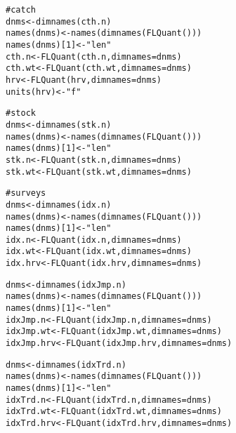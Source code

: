 \documentclass[a4paper,english,10pt]{article}\usepackage[]{graphicx}\usepackage[]{color}
\makeatletter
\newcommand{\hlnum}[1]{\textcolor[rgb]{0.2,0.2,0.2}{#1}}%
\newcommand{\hlstr}[1]{\textcolor[rgb]{0.2,0.2,0.2}{#1}}%
\newcommand{\hlcom}[1]{\textcolor[rgb]{0.2,0.267,0.4}{#1}}%
\newcommand{\hlstd}[1]{\textcolor[rgb]{0,0,0}{#1}}%
\newcommand{\hlkwb}[1]{\textcolor[rgb]{0.361,0.506,0.596}{#1}}%
\newcommand{\hlkwc}[1]{\textcolor[rgb]{0.361,0.506,0.596}{#1}}%
\newcommand{\hlkwd}[1]{\textcolor[rgb]{0.361,0.506,0.596}{#1}}%
\newenvironment{kframe}{%
 \def\at@end@of@kframe{}%
 \ifinner\ifhmode%
  \def\at@end@of@kframe{\end{minipage}}%
  \begin{minipage}{\columnwidth}%
 \fi\fi%
 \def\FrameCommand##1{\hskip\@totalleftmargin \hskip-\fboxsep
 \colorbox{shadecolor}{##1}\hskip-\fboxsep
     \hskip-\linewidth \hskip-\@totalleftmargin \hskip\columnwidth}%
 \MakeFramed {\advance\hsize-\width
   \@totalleftmargin\z@ \linewidth\hsize
   \@setminipage}}%
 {\par\unskip\endMakeFramed%
 \at@end@of@kframe}
\newenvironment{knitrout}{}{} %
\makeatother
\begin{document}
\begin{knitrout}
\color{fgcolor}\begin{kframe}
\begin{alltt}
\hlcom{# catch}
\hlstd{dnms} \hlkwb{<-} \hlkwd{dimnames}\hlstd{(cth.n)}
\hlkwd{names}\hlstd{(dnms)} \hlkwb{<-} \hlkwd{names}\hlstd{(}\hlkwd{dimnames}\hlstd{(}\hlkwd{FLQuant}\hlstd{()))}
\hlkwd{names}\hlstd{(dnms)[}\hlnum{1}\hlstd{]} \hlkwb{<-} \hlstr{"len"}
\hlstd{cth.n} \hlkwb{<-} \hlkwd{FLQuant}\hlstd{(cth.n,} \hlkwc{dimnames}\hlstd{=dnms)}
\hlstd{cth.wt} \hlkwb{<-} \hlkwd{FLQuant}\hlstd{(cth.wt,} \hlkwc{dimnames}\hlstd{=dnms)}
\hlstd{hrv} \hlkwb{<-} \hlkwd{FLQuant}\hlstd{(hrv,} \hlkwc{dimnames}\hlstd{=dnms)}
\hlkwd{units}\hlstd{(hrv)} \hlkwb{<-} \hlstr{"f"}

\hlcom{# stock}
\hlstd{dnms} \hlkwb{<-} \hlkwd{dimnames}\hlstd{(stk.n)}
\hlkwd{names}\hlstd{(dnms)} \hlkwb{<-} \hlkwd{names}\hlstd{(}\hlkwd{dimnames}\hlstd{(}\hlkwd{FLQuant}\hlstd{()))}
\hlkwd{names}\hlstd{(dnms)[}\hlnum{1}\hlstd{]} \hlkwb{<-} \hlstr{"len"}
\hlstd{stk.n} \hlkwb{<-} \hlkwd{FLQuant}\hlstd{(stk.n,} \hlkwc{dimnames}\hlstd{=dnms)}
\hlstd{stk.wt} \hlkwb{<-} \hlkwd{FLQuant}\hlstd{(stk.wt,} \hlkwc{dimnames}\hlstd{=dnms)}

\hlcom{# surveys}
\hlstd{dnms} \hlkwb{<-} \hlkwd{dimnames}\hlstd{(idx.n)}
\hlkwd{names}\hlstd{(dnms)} \hlkwb{<-} \hlkwd{names}\hlstd{(}\hlkwd{dimnames}\hlstd{(}\hlkwd{FLQuant}\hlstd{()))}
\hlkwd{names}\hlstd{(dnms)[}\hlnum{1}\hlstd{]} \hlkwb{<-} \hlstr{"len"}
\hlstd{idx.n} \hlkwb{<-} \hlkwd{FLQuant}\hlstd{(idx.n,} \hlkwc{dimnames}\hlstd{=dnms)}
\hlstd{idx.wt} \hlkwb{<-} \hlkwd{FLQuant}\hlstd{(idx.wt,} \hlkwc{dimnames}\hlstd{=dnms)}
\hlstd{idx.hrv} \hlkwb{<-} \hlkwd{FLQuant}\hlstd{(idx.hrv,} \hlkwc{dimnames}\hlstd{=dnms)}

\hlstd{dnms} \hlkwb{<-} \hlkwd{dimnames}\hlstd{(idxJmp.n)}
\hlkwd{names}\hlstd{(dnms)} \hlkwb{<-} \hlkwd{names}\hlstd{(}\hlkwd{dimnames}\hlstd{(}\hlkwd{FLQuant}\hlstd{()))}
\hlkwd{names}\hlstd{(dnms)[}\hlnum{1}\hlstd{]} \hlkwb{<-} \hlstr{"len"}
\hlstd{idxJmp.n} \hlkwb{<-} \hlkwd{FLQuant}\hlstd{(idxJmp.n,} \hlkwc{dimnames}\hlstd{=dnms)}
\hlstd{idxJmp.wt} \hlkwb{<-} \hlkwd{FLQuant}\hlstd{(idxJmp.wt,} \hlkwc{dimnames}\hlstd{=dnms)}
\hlstd{idxJmp.hrv} \hlkwb{<-} \hlkwd{FLQuant}\hlstd{(idxJmp.hrv,} \hlkwc{dimnames}\hlstd{=dnms)}

\hlstd{dnms} \hlkwb{<-} \hlkwd{dimnames}\hlstd{(idxTrd.n)}
\hlkwd{names}\hlstd{(dnms)} \hlkwb{<-} \hlkwd{names}\hlstd{(}\hlkwd{dimnames}\hlstd{(}\hlkwd{FLQuant}\hlstd{()))}
\hlkwd{names}\hlstd{(dnms)[}\hlnum{1}\hlstd{]} \hlkwb{<-} \hlstr{"len"}
\hlstd{idxTrd.n} \hlkwb{<-} \hlkwd{FLQuant}\hlstd{(idxTrd.n,} \hlkwc{dimnames}\hlstd{=dnms)}
\hlstd{idxTrd.wt} \hlkwb{<-} \hlkwd{FLQuant}\hlstd{(idxTrd.wt,} \hlkwc{dimnames}\hlstd{=dnms)}
\hlstd{idxTrd.hrv} \hlkwb{<-} \hlkwd{FLQuant}\hlstd{(idxTrd.hrv,} \hlkwc{dimnames}\hlstd{=dnms)}
\end{alltt}
\end{kframe}
\end{knitrout}
\end{document}
